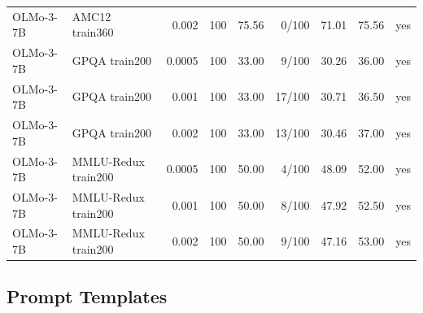 \begin{table}[t]
{\begin{tabular}{llrrrrrrr}
OLMo-3-7B & AMC12 train360 & 0.002 & 100 & 75.56 & 0/100 & 71.01 & 75.56 & yes \\
OLMo-3-7B & GPQA train200 & 0.0005 & 100 & 33.00 & 9/100 & 30.26 & 36.00 & yes \\
OLMo-3-7B & GPQA train200 & 0.001 & 100 & 33.00 & 17/100 & 30.71 & 36.50 & yes \\
OLMo-3-7B & GPQA train200 & 0.002 & 100 & 33.00 & 13/100 & 30.46 & 37.00 & yes \\
OLMo-3-7B & MMLU-Redux train200 & 0.0005 & 100 & 50.00 & 4/100 & 48.09 & 52.00 & yes \\
OLMo-3-7B & MMLU-Redux train200 & 0.001 & 100 & 50.00 & 8/100 & 47.92 & 52.50 & yes \\
OLMo-3-7B & MMLU-Redux train200 & 0.002 & 100 & 50.00 & 9/100 & 47.16 & 53.00 & yes \\
\bottomrule
\end{tabular}
}
\label{tab:seed_profiling_details}
\end{table}

\subsection{Prompt Templates}
\label{app:prompts}

